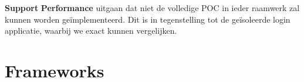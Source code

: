 \documentclass[a4paper]{artikel3}
\renewcommand{\paragraph}[1]{{\bf #1} }
\begin{document}
\paragraph{Support}%
% 
% 
\paragraph{Performance}%
% 
uitgaan dat niet de volledige POC in ieder raamwerk zal kunnen worden geïmplementeerd. Dit is in tegenstelling tot de geïsoleerde login applicatie, waarbij we exact kunnen vergelijken.

\newpage
\section{Frameworks} %
\label{sec:frameworks}
\end{document}

